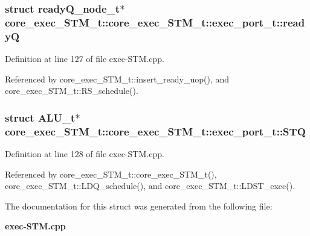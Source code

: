 \subsubsection[{readyQ}]{\setlength{\rightskip}{0pt plus 5cm}struct {\bf readyQ\_\-node\_\-t}$\ast$ core\_\-exec\_\-STM\_\-t::core\_\-exec\_\-STM\_\-t::exec\_\-port\_\-t::readyQ\hspace{0.3cm}{\tt  [read]}}\label{structcore__exec__STM__t_1_1exec__port__t_15d5289a63142a69d492f6d96b2e895d}




Definition at line 127 of file exec-STM.cpp.

Referenced by core\_\-exec\_\-STM\_\-t::insert\_\-ready\_\-uop(), and core\_\-exec\_\-STM\_\-t::RS\_\-schedule().
\subsubsection[{STQ}]{\setlength{\rightskip}{0pt plus 5cm}struct {\bf ALU\_\-t}$\ast$ core\_\-exec\_\-STM\_\-t::core\_\-exec\_\-STM\_\-t::exec\_\-port\_\-t::STQ\hspace{0.3cm}{\tt  [read]}}\label{structcore__exec__STM__t_1_1exec__port__t_ad317b85dd3482bdca54f12cc744ad53}




Definition at line 128 of file exec-STM.cpp.

Referenced by core\_\-exec\_\-STM\_\-t::core\_\-exec\_\-STM\_\-t(), core\_\-exec\_\-STM\_\-t::LDQ\_\-schedule(), and core\_\-exec\_\-STM\_\-t::LDST\_\-exec().

The documentation for this struct was generated from the following file:\begin{CompactItemize}
\item 
{\bf exec-STM.cpp}\end{CompactItemize}
